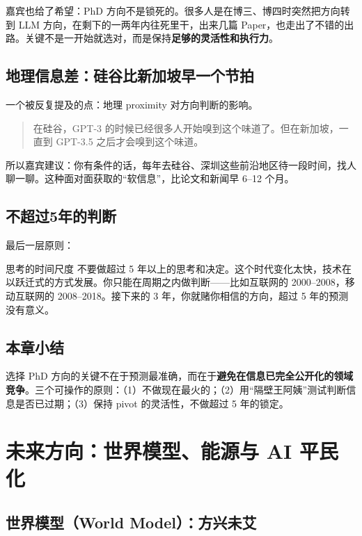 嘉宾也给了希望：PhD 方向不是锁死的。很多人是在博三、博四时突然把方向转到 LLM 方向，在剩下的一两年内往死里干，出来几篇 Paper，也走出了不错的出路。关键不是一开始就选对，而是保持\textbf{足够的灵活性和执行力}。

\subsection{地理信息差：硅谷比新加坡早一个节拍}

一个被反复提及的点：地理 proximity 对方向判断的影响。

\begin{quote}
在硅谷，GPT-3 的时候已经很多人开始嗅到这个味道了。但在新加坡，一直到 GPT-3.5 之后才会嗅到这个味道。
\end{quote}

所以嘉宾建议：你有条件的话，每年去硅谷、深圳这些前沿地区待一段时间，找人聊一聊。这种面对面获取的``软信息''，比论文和新闻早 6--12 个月。

\subsection{不超过5年的判断}

最后一层原则：

\begin{importantbox}{思考的时间尺度}
不要做超过 5 年以上的思考和决定。这个时代变化太快，技术在以跃迁式的方式发展。你只能在周期之内做判断——比如互联网的 2000--2008，移动互联网的 2008--2018。接下来的 3 年，你就赌你相信的方向，超过 5 年的预测没有意义。
\end{importantbox}

\subsection{本章小结}

选择 PhD 方向的关键不在于预测最准确，而在于\textbf{避免在信息已完全公开化的领域竞争}。三个可操作的原则：（1）不做现在最火的；（2）用``隔壁王阿姨''测试判断信息是否已过期；（3）保持 pivot 的灵活性，不做超过 5 年的锁定。


\section{未来方向：世界模型、能源与 AI 平民化}

\subsection{世界模型（World Model）：方兴未艾}

